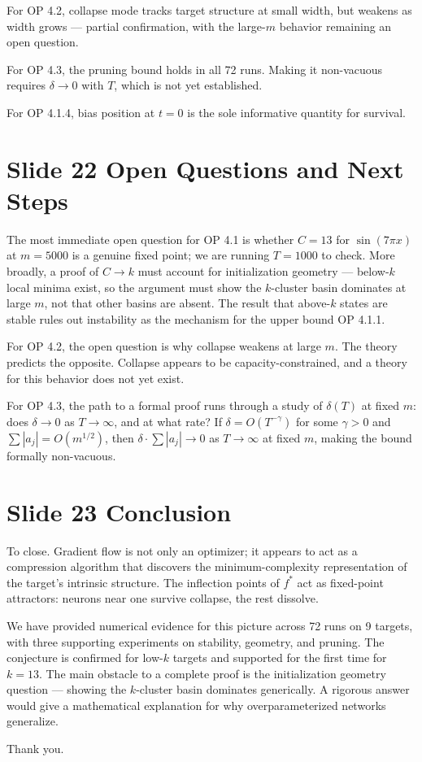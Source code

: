 \documentclass[11pt]{article}
\begin{document}
For OP 4.2, collapse mode tracks target structure at small width, but weakens as width grows --- partial confirmation, with the large-$m$ behavior remaining an open question.

For OP 4.3, the pruning bound holds in all 72 runs.
Making it non-vacuous requires $\delta \to 0$ with $T$, which is not yet established.

For OP 4.1.4, bias position at $t = 0$ is the sole informative quantity for survival.

\section*{Slide 22 \quad Open Questions and Next Steps}

The most immediate open question for OP 4.1 is whether $C = 13$ for $\sin(7\pi x)$ at $m = 5000$ is a genuine fixed point; we are running $T = 1000$ to check.
More broadly, a proof of $C \to k$ must account for initialization geometry --- below-$k$ local minima exist, so the argument must show the $k$-cluster basin dominates at large $m$, not that other basins are absent.
The result that above-$k$ states are stable rules out instability as the mechanism for the upper bound OP 4.1.1.

For OP 4.2, the open question is why collapse weakens at large $m$.
The theory predicts the opposite.
Collapse appears to be capacity-constrained, and a theory for this behavior does not yet exist.

For OP 4.3, the path to a formal proof runs through a study of $\delta(T)$ at fixed $m$: does $\delta \to 0$ as $T \to \infty$, and at what rate?
If $\delta = O(T^{-\gamma})$ for some $\gamma > 0$ and $\sum|a_j| = O(m^{1/2})$, then $\delta \cdot \sum|a_j| \to 0$ as $T \to \infty$ at fixed $m$, making the bound formally non-vacuous.

\section*{Slide 23 \quad Conclusion}

To close.
Gradient flow is not only an optimizer; it appears to act as a compression algorithm that discovers the minimum-complexity representation of the target's intrinsic structure.
The inflection points of $f^*$ act as fixed-point attractors: neurons near one survive collapse, the rest dissolve.

We have provided numerical evidence for this picture across 72 runs on 9 targets, with three supporting experiments on stability, geometry, and pruning.
The conjecture is confirmed for low-$k$ targets and supported for the first time for $k = 13$.
The main obstacle to a complete proof is the initialization geometry question --- showing the $k$-cluster basin dominates generically.
A rigorous answer would give a mathematical explanation for why overparameterized networks generalize.

Thank you.
\end{document}
